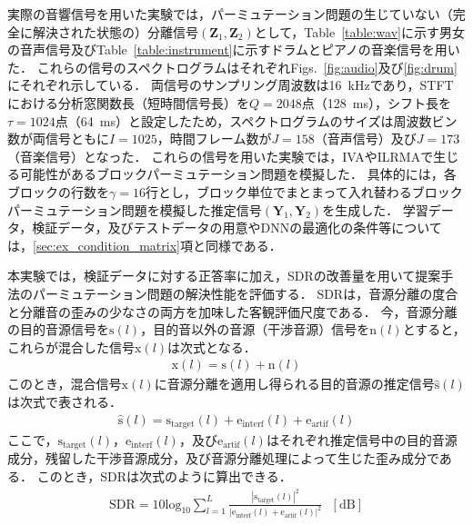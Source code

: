 
実際の音響信号を用いた実験では，パーミュテーション問題の生じていない（完全に解決された状態の）分離信号$(\bm{Z}_1, \bm{Z}_2)$として，Table~\ref{table:wav}に示す男女の音声信号及びTable~\ref{table:instrument}に示すドラムとピアノの音楽信号を用いた．
これらの信号のスペクトログラムはそれぞれFigs.~\ref{fig:audio}及び\ref{fig:drum}にそれぞれ示している．
両信号のサンプリング周波数は16~kHzであり，STFTにおける分析窓関数長（短時間信号長）を$Q=2048$点（128~ms），シフト長を$\tau=1024$点（64~ms）と設定したため，スペクトログラムのサイズは周波数ビン数が両信号ともに$I=1025$，時間フレーム数が$J=158$（音声信号）及び$J=173$（音楽信号）となった．
これらの信号を用いた実験では，IVAやILRMAで生じる可能性があるブロックパーミュテーション問題を模擬した．
具体的には，各ブロックの行数を$\gamma=16$行とし，ブロック単位でまとまって入れ替わるブロックパーミュテーション問題を模擬した推定信号$(\bm{Y}_1, \bm{Y}_2)$を生成した．
学習データ，検証データ，及びテストデータの用意やDNNの最適化の条件等については，\ref{sec:ex_condition_matrix}項と同様である．

本実験では，検証データに対する正答率に加え，SDRの改善量を用いて提案手法のパーミュテーション問題の解決性能を評価する．
SDRは，音源分離の度合と分離音の歪みの少なさの両方を加味した客観評価尺度である．
今，音源分離の目的音源信号を$\mathrm{s}(l)$，目的音以外の音源（干渉音源）信号を$\mathrm{n}(l)$とすると，これらが混合した信号$\mathrm{x}(l)$は次式となる．
\begin{align}
    \mathrm{x}(l) = \mathrm{s}(l) + \mathrm{n}(l)
\end{align}
このとき，混合信号$\mathrm{x}(l)$に音源分離を適用し得られる目的音源の推定信号$\hat{\mathrm{s}}(l)$は次式で表される．
\begin{align}
   \hat{\mathrm{s}}(l) = \mathrm{s}_{\mathrm{target}}(l) + \mathrm{e}_{\mathrm{interf}}(l) + \mathrm{e}_{\mathrm{artif}}(l)
\end{align}
ここで，$\mathrm{s}_{\mathrm{target}}(l)$，$\mathrm{e}_{\mathrm{interf}}(l)$，及び$\mathrm{e}_{\mathrm{artif}}(l)$はそれぞれ推定信号中の目的音源成分，残留した干渉音源成分，及び音源分離処理によって生じた歪み成分である．
このとき，SDRは次式のように算出できる．
\begin{align}
    \mathrm{SDR} = 10 \mathrm{log}_{10} \sum_{l=1}^L \frac{|\mathrm{s}_{\mathrm{target}}(l)|^2}{|\mathrm{e}_{\mathrm{interf}}(l) + \mathrm{e}_{\mathrm{artif}}(l)|^2}~~~\mathrm{[dB]}
\end{align}
